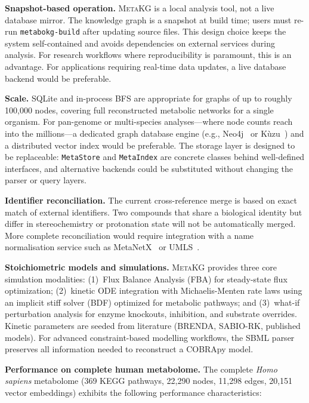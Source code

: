 \documentclass[10pt]{article}
\begin{document}
\textbf{Snapshot-based operation.} \textsc{MetaKG} is a local analysis tool, not a live
database mirror. The knowledge graph is a snapshot at build time; users must
re-run \texttt{metabokg-build} after updating source files. This design choice
keeps the system self-contained and avoids dependencies on external services
during analysis. For research workflows where reproducibility is paramount, this
is an advantage. For applications requiring real-time data updates, a live
database backend would be preferable.

\textbf{Scale.} SQLite and in-process BFS are appropriate for graphs of up to
roughly 100,000 nodes, covering full reconstructed metabolic networks for a
single organism. For pan-genome or multi-species analyses---where node counts
reach into the millions---a dedicated graph database engine (e.g.,
Neo4j~\citep{neo4j2020} or Kùzu~\citep{feng2023kuzu}) and a distributed
vector index would be preferable. The storage layer is designed to be
replaceable: \texttt{MetaStore} and \texttt{MetaIndex} are concrete classes
behind well-defined interfaces, and alternative backends could be substituted
without changing the parser or query layers.

\textbf{Identifier reconciliation.} The current cross-reference merge is
based on exact match of external identifiers. Two compounds that share a
biological identity but differ in stereochemistry or protonation state will
not be automatically merged. More complete reconciliation would require
integration with a name normalisation service such as
MetaNetX~\citep{moretti2021metanetx} or UMLS~\citep{bodenreider2004umls}.

\textbf{Stoichiometric models and simulations.} \textsc{MetaKG} provides three
core simulation modalities: (1)~Flux Balance Analysis (FBA) for steady-state
flux optimization; (2)~kinetic ODE integration with Michaelis-Menten rate laws
using an implicit stiff solver (BDF) optimized for metabolic pathways; and
(3)~what-if perturbation analysis for enzyme knockouts, inhibition, and substrate
overrides. Kinetic parameters are seeded from literature (BRENDA, SABIO-RK,
published models). For advanced constraint-based modelling workflows, the SBML
parser preserves all information needed to reconstruct a COBRApy model.

\textbf{Performance on complete human metabolome.} The complete \textit{Homo sapiens}
metabolome (369 KEGG pathways, 22,290 nodes, 11,298 edges, 20,151 vector embeddings)
exhibits the following performance characteristics:
\end{document}
